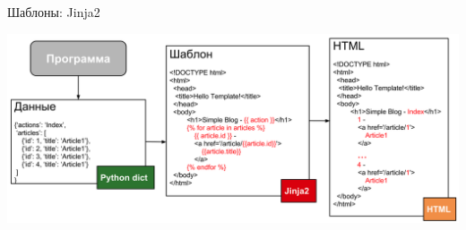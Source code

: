 \begin{frame}{Шаблоны: Jinja2}

  \begin{center}
    \includegraphics[width=\textwidth,height=\textheight,keepaspectratio]{media/template.png}
  \end{center}

\end{frame}



